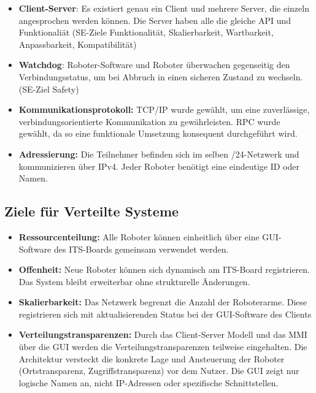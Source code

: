 \begin{itemize}
	\item \textbf{Client-Server}: Es existiert genau ein Client und mehrere Server, die einzeln angesprochen werden können. Die Server haben alle die gleiche API und Funktionaliät (SE-Ziele Funktionalität, Skalierbarkeit, Wartbarkeit, Anpassbarkeit, Kompatibilität)
	\item \textbf{Watchdog}: Roboter-Software und Roboter überwachen gegenseitig den Verbindungsstatus, um bei Abbruch in einen sicheren Zustand zu wechseln. (SE-Ziel Safety)
	\item \textbf{Kommunikationsprotokoll:} TCP/IP wurde gewählt, um eine zuverlässige, verbindungsorientierte Kommunikation zu gewährleisten. RPC wurde gewählt, da so eine funktionale Umsetzung konsequent durchgeführt wird.
	\item \textbf{Adressierung:} Die Teilnehmer befinden sich im selben /24-Netzwerk und kommunizieren über IPv4. Jeder Roboter benötigt eine eindeutige ID oder Namen.
\end{itemize}

\subsection*{Ziele für Verteilte Systeme}
\begin{itemize}
	\item \textbf{Ressourcenteilung:} Alle Roboter können einheitlich über eine GUI-Software des ITS-Boards gemeinsam verwendet werden.
	\item \textbf{Offenheit:} Neue Roboter können sich dynamisch am ITS-Board registrieren. Das System bleibt erweiterbar ohne strukturelle Änderungen.
	\item \textbf{Skalierbarkeit:} Das Netzwerk begrenzt die Anzahl der Roboterarme. Diese registrieren sich mit aktualisierenden Status bei der GUI-Software des Clients
	\item \textbf{Verteilungstransparenzen:} Durch das Client-Server Modell und das MMI über die GUI werden die Verteilungstransparenzen teilweise eingehalten. Die Architektur versteckt die konkrete Lage und Ansteuerung der Roboter (Ortstransparenz, Zugriffstransparenz) vor dem Nutzer. Die GUI zeigt nur logische Namen an, nicht IP-Adressen oder spezifische Schnittstellen.
\end{itemize}


